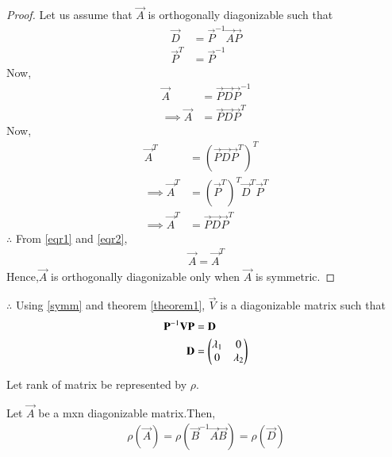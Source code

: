 \documentclass[journal,12pt,twocolumn]{IEEEtran}
\begin{document}
\begin{proof}
Let us assume that $\vec{A}$ is orthogonally diagonizable such that 
\begin{align}
    \vec{D} &= \vec{P}^{-1}\vec{A}\vec{P}
    \\
    \vec{P}^T &= \vec{P}^{-1}
\end{align}
Now,
\begin{align}
    \vec{A} &= \vec{P}\vec{D}\vec{P}^{-1}
    \\
    \implies \vec{A} &= \vec{P}\vec{D}\vec{P}^T \label{eqr1}
\end{align}
Now,
\begin{align}
    \vec{A}^T &= (\vec{P}\vec{D}\vec{P}^T)^T
    \\
    \implies \vec{A}^T &= (\vec{P}^T)^T\vec{D}^T\vec{P}^T
    \\
    \implies \vec{A}^T &= \vec{P}\vec{D}\vec{P}^T \label{eqr2}
\end{align}
$\therefore$ From \eqref{eqr1} and \eqref{eqr2},
\begin{align}
    \vec{A} = \vec{A}^T
\end{align}
Hence,$\vec{A}$ is orthogonally diagonizable only when $\vec{A}$ is symmetric.
\end{proof}

$\therefore$ Using \eqref{symm} and theorem \ref{theorem1}, $\vec{V}$ is a diagonizable matrix such that
\begin{align}
    \mathbf{P}^{-1}\mathbf{V}\mathbf{P} &= \mathbf{D} 
    \\
    \mathbf{D} &= \begin{pmatrix}\lambda_1 & 0 \\ 0 & \lambda_2\end{pmatrix}
\end{align}

Let rank of matrix be represented by $\rho$.

\begin{lemma}
\label{lemma1}
Let $\vec{A}$ be a mxn diagonizable matrix.Then,
\begin{align}
   \rho(\vec{A}) = \rho(\vec{B}^{-1}\vec{A}\vec{B}) = \rho(\vec{D}) \label{eqq1}
\end{align}
\end{lemma}
\end{document}
